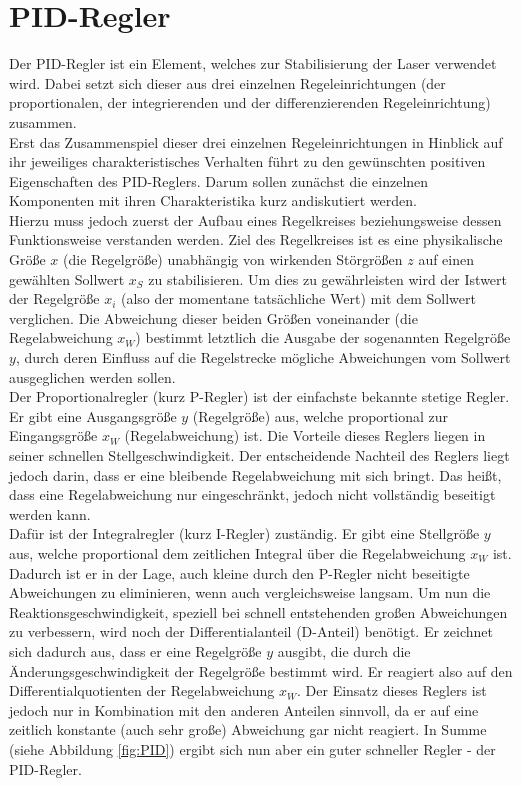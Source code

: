 \documentclass[
class=book,
accentcolor=1b,
custommargins=geometry,
fontsize=11pt,
thesis={type=Versuchsanleitung},
ruledheaders=all,
headline=false,
instbox=false,
marginpar=false,
title=small,
ignore-missing-data=true,
twoside=false,
logofile=apqdesign/tuda_logo.pdf,
pdfa=false %
]{apqpub}
\begin{document}
			\section{PID-Regler}			
			Der PID-Regler ist ein Element, welches zur Stabilisierung der Laser verwendet wird. Dabei setzt sich dieser aus drei einzelnen Regeleinrichtungen (der proportionalen, der integrierenden und der differenzierenden Regeleinrichtung) zusammen.\\
			Erst das Zusammenspiel dieser drei einzelnen Regeleinrichtungen in Hinblick auf ihr jeweiliges charakteristisches Verhalten führt zu den gewünschten positiven Eigenschaften des PID-Reglers. 
			Darum sollen zunächst die einzelnen Komponenten mit ihren Charakteristika kurz andiskutiert werden.\\
			Hierzu muss jedoch zuerst der Aufbau eines Regelkreises beziehungsweise dessen Funktionsweise verstanden werden. Ziel des Regelkreises ist es eine physikalische Größe $x$ (die Regelgröße) unabhängig von wirkenden Störgrößen $z$ auf einen gewählten Sollwert $x_S$ zu stabilisieren. 
			Um dies zu gewährleisten wird der Istwert der Regelgröße $x_i$ (also der momentane tatsächliche Wert) mit dem Sollwert verglichen. Die Abweichung dieser beiden Größen voneinander (die Regelabweichung $x_W$) bestimmt letztlich die Ausgabe der sogenannten Regelgröße $y$, durch deren Einfluss auf die Regelstrecke mögliche Abweichungen vom Sollwert ausgeglichen werden sollen.\\ 
			Der Proportionalregler (kurz P-Regler) ist der einfachste bekannte stetige Regler. 
			Er gibt eine Ausgangsgröße $y$ (Regelgröße) aus, welche proportional zur Eingangsgröße $x_W$ (Regelabweichung) ist. 
			Die Vorteile dieses Reglers liegen in seiner schnellen Stellgeschwindigkeit. 
			Der entscheidende Nachteil des Reglers liegt jedoch darin, dass er eine bleibende Regelabweichung mit sich bringt. 
			Das heißt, dass eine Regelabweichung nur eingeschränkt, jedoch nicht vollständig beseitigt werden kann.\\
			Dafür ist der Integralregler (kurz I-Regler) zuständig. 
			Er gibt eine Stellgröße $y$ aus, welche proportional dem zeitlichen Integral über die Regelabweichung $x_W$ ist. 
			Dadurch ist er in der Lage, auch kleine durch den P-Regler nicht beseitigte Abweichungen zu eliminieren, wenn auch vergleichsweise langsam.
			Um nun die Reaktionsgeschwindigkeit, speziell bei schnell entstehenden großen Abweichungen zu verbessern, wird noch der Differentialanteil (D-Anteil) benötigt. 
			Er zeichnet sich dadurch aus, dass er eine Regelgröße $y$ ausgibt, die durch die Änderungsgeschwindigkeit der Regelgröße bestimmt wird. 
			Er reagiert also auf den Differentialquotienten der Regelabweichung $x_W$. 
			Der Einsatz dieses Reglers ist jedoch nur in Kombination mit den anderen Anteilen sinnvoll, da er auf eine zeitlich konstante (auch sehr große) Abweichung gar nicht reagiert. 
			In Summe (siehe Abbildung \ref{fig:PID}) ergibt sich nun aber ein guter schneller Regler - der PID-Regler. \cite{PID} 
			
\end{document}
